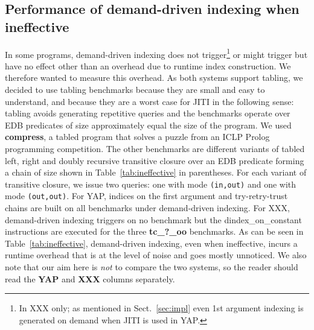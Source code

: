 \documentclass{llncs}
\newcommand{\code}[1]{\texttt{#1}}
\newcommand{\instr}[1]{\textsf{#1}}
\newcommand{\TryRetryTrust}{\mbox{\instr{try-retry-trust}}\xspace}
\newcommand{\jitiONconstant}{\mbox{\instr{dindex\_on\_constant}}\xspace}
\newcommand{\JITI}{demand-driven indexing\xspace}
\newcommand{\bench}[1]{\textbf{\textsf{#1}}}
\newcommand{\compress}{\bench{compress}\xspace}
\begin{document}
\subsection{Performance of \JITI when ineffective} \label{sec:perf:ineffective}
In some programs, \JITI does not trigger\footnote{In XXX only; as
mentioned in Sect.~\ref{sec:impl} even 1st argument indexing is
generated on demand when JITI is used in YAP.} or might trigger but
have no effect other than an overhead due to runtime index
construction. We therefore wanted to measure this overhead.
%
As both systems support tabling, we decided to use tabling benchmarks
because they are small and easy to understand, and because they are a
worst case for JITI in the following sense: tabling avoids generating
repetitive queries and the benchmarks operate over EDB predicates of
size approximately equal the size of the program. We used \compress, a
tabled program that solves a puzzle from an ICLP Prolog programming
competition. The other benchmarks are different variants of tabled
left, right and doubly recursive transitive closure over an EDB
predicate forming a chain of size shown in Table~\ref{tab:ineffective}
in parentheses. For each variant of transitive closure, we issue two
queries: one with mode \code{(in,out)} and one with mode
\code{(out,out)}.
%
For YAP, indices on the first argument and \TryRetryTrust chains are
built on all benchmarks under \JITI.
%
For XXX, \JITI triggers on no benchmark but the \jitiONconstant
instructions are executed for the three \bench{tc\_?\_oo} benchmarks.
%
As can be seen in Table~\ref{tab:ineffective}, \JITI, even when
ineffective, incurs a runtime overhead that is at the level of noise
and goes mostly unnoticed.
%
We also note that our aim here is \emph{not} to compare the two
systems, so the reader should read the \textbf{YAP} and \textbf{XXX}
columns separately.
\end{document}
